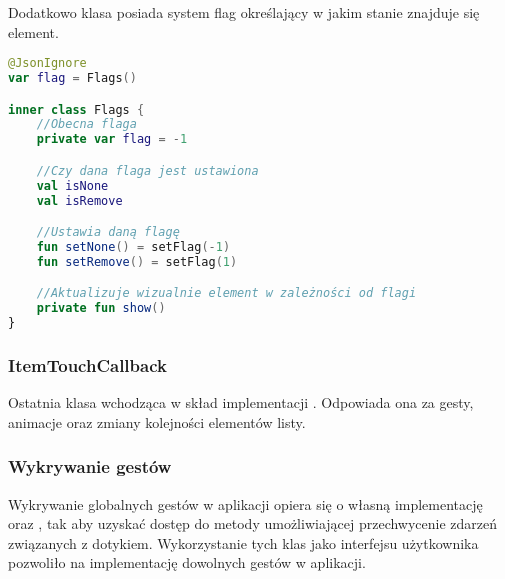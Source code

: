 \newpage

Dodatkowo klasa  posiada system flag określający w jakim stanie znajduje się element.

\begin{lstlisting}[language=Kotlin]
@JsonIgnore
var flag = Flags()

inner class Flags {
    //Obecna flaga
    private var flag = -1

    //Czy dana flaga jest ustawiona
    val isNone
    val isRemove

    //Ustawia daną flagę
    fun setNone() = setFlag(-1)
    fun setRemove() = setFlag(1)

    //Aktualizuje wizualnie element w zależności od flagi
    private fun show()
}
\end{lstlisting}

\subsubsection{ItemTouchCallback}
Ostatnia klasa wchodząca w skład implementacji . Odpowiada ona za gesty, animacje oraz zmiany kolejności elementów listy.

\subsubsection{Wykrywanie gestów}
Wykrywanie globalnych gestów w aplikacji opiera się o własną implementację  oraz , tak aby uzyskać dostęp do metody  umożliwiającej przechwycenie zdarzeń związanych z dotykiem. Wykorzystanie tych klas jako  interfejsu użytkownika pozwoliło na implementację dowolnych gestów w aplikacji.